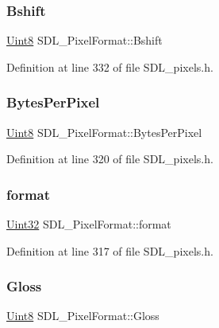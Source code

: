 \subsubsection{\texorpdfstring{Bshift}{Bshift}}
{\footnotesize\ttfamily \mbox{\hyperlink{_s_d_l__stdinc_8h_a2944638813a090aa23e62f4da842c3e2}{Uint8}} S\+D\+L\+\_\+\+Pixel\+Format\+::\+Bshift}



Definition at line 332 of file S\+D\+L\+\_\+pixels.\+h.

\mbox{\label{struct_s_d_l___pixel_format_a6fec9e1809cc3da458d58b8cccd058f2}} 
\subsubsection{\texorpdfstring{BytesPerPixel}{BytesPerPixel}}
{\footnotesize\ttfamily \mbox{\hyperlink{_s_d_l__stdinc_8h_a2944638813a090aa23e62f4da842c3e2}{Uint8}} S\+D\+L\+\_\+\+Pixel\+Format\+::\+Bytes\+Per\+Pixel}



Definition at line 320 of file S\+D\+L\+\_\+pixels.\+h.

\mbox{\label{struct_s_d_l___pixel_format_a44045e1da843f3d1fad3a608e16af712}} 
\subsubsection{\texorpdfstring{format}{format}}
{\footnotesize\ttfamily \mbox{\hyperlink{_s_d_l__stdinc_8h_add440eff171ea5f55cb00c4a9ab8672d}{Uint32}} S\+D\+L\+\_\+\+Pixel\+Format\+::format}



Definition at line 317 of file S\+D\+L\+\_\+pixels.\+h.

\mbox{\label{struct_s_d_l___pixel_format_a94469768d8436e631a13d68623ff663f}} 
\subsubsection{\texorpdfstring{Gloss}{Gloss}}
{\footnotesize\ttfamily \mbox{\hyperlink{_s_d_l__stdinc_8h_a2944638813a090aa23e62f4da842c3e2}{Uint8}} S\+D\+L\+\_\+\+Pixel\+Format\+::\+Gloss}



